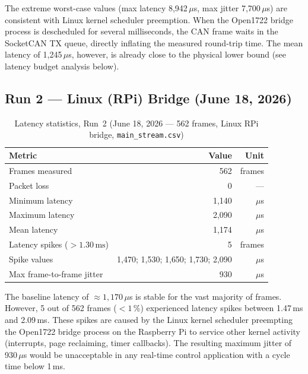 \documentclass[11pt,a4paper]{article}
\begin{document}
The extreme worst-case values (max latency 8{,}942\,$\mu$s, max jitter 7{,}700\,$\mu$s) are
consistent with Linux kernel scheduler preemption.  When the Open1722 bridge process is
descheduled for several milliseconds, the CAN frame waits in the SocketCAN TX queue,
directly inflating the measured round-trip time.  The mean latency of 1{,}245\,$\mu$s,
however, is already close to the physical lower bound (see latency budget analysis below).

\subsection{Run 2 --- Linux (RPi) Bridge (June 18, 2026)}
\label{sec:run2}

\begin{table}[H]
    \centering
    \caption{Latency statistics, Run~2 (June 18, 2026 --- 562 frames, Linux RPi bridge,
             \texttt{main\_stream.csv})}
    \label{tab:run2}
    \begin{tabular}{lrr}
        \toprule
        \textbf{Metric} & \textbf{Value} & \textbf{Unit} \\
        \midrule
        Frames measured   & 562     & frames \\
        Packet loss       & 0       & --- \\
        \midrule
        Minimum latency   & 1{,}140 & $\mu$s \\
        Maximum latency   & 2{,}090 & $\mu$s \\
        Mean latency      & 1{,}174 & $\mu$s \\
        \midrule
        Latency spikes ($>1.30\,\text{ms}$) & 5 & frames \\
        Spike values                         & 1{,}470; 1{,}530; 1{,}650; 1{,}730; 2{,}090 & $\mu$s \\
        Max frame-to-frame jitter            & 930 & $\mu$s \\
        \bottomrule
    \end{tabular}
\end{table}

The baseline latency of $\approx 1{,}170\,\mu$s is stable for the vast majority of frames.
However, 5 out of 562 frames ($<1\,\%$) experienced latency spikes between 1.47\,ms and
2.09\,ms.  These spikes are caused by the Linux kernel scheduler preempting the Open1722
bridge process on the Raspberry Pi to service other kernel activity (interrupts, page
reclaiming, timer callbacks).  The resulting maximum jitter of 930\,$\mu$s would be
unacceptable in any real-time control application with a cycle time below 1\,ms.
\end{document}
